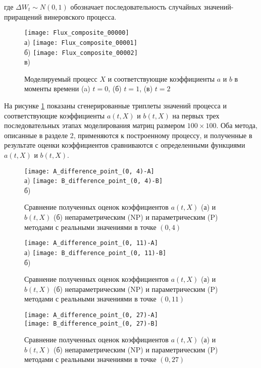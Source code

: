 где $\Delta W_t \sim N(0,1)$ обозначает последовательность случайных значений-приращений винеровского процесса.

\begin{figure}[!h]
	\centering
	\texttt{[image: Flux\_composite\_00000]}\\
	а)
	\texttt{[image: Flux\_composite\_00001]}\\
	б)
	\texttt{[image: Flux\_composite\_00002]}\\
	в)
	\caption{Моделируемый процесс $X$ и соответствующие коэффициенты $a$ и $b$ в моменты времени (a) $t=0$, (б) $t=1$, (в) $t=2$}
	\label{fig:flux_simulation}
\end{figure}

На рисунке \ref{fig:flux_simulation} показаны сгенерированные триплеты значений процесса и соответствующие коэффициенты $a(t,X)$ и $b(t,X)$ на первых трех последовательных этапах моделирования матриц размером $100 \times 100$. Оба метода, описанные в разделе 2, применяются к построенному процессу, и полученные в результате оценки коэффициентов сравниваются с определенными функциями $a(t,X)$ и $b(t,X)$.

\begin{figure}[!h]
	\centering
	\texttt{[image: A\_difference\_point\_(0, 4)-A]}\\
	а)
	\texttt{[image: B\_difference\_point\_(0, 4)-B]}\\
	б)
	\caption{Сравнение полученных оценок коэффициентов $a(t,X)$ (а) и $b(t,X)$ (б) непараметрическим (NP) и параметрическим (P) методами с реальными значениями в точке $(0,4)$}
	\label{fig:difference_0_4}
\end{figure}

\begin{figure}[!h]
	\centering
	\texttt{[image: A\_difference\_point\_(0, 11)-A]}\\
	а)
	\texttt{[image: B\_difference\_point\_(0, 11)-B]}\\
	б)
	\caption{Сравнение полученных оценок коэффициентов $a(t,X)$ (а) и $b(t,X)$ (б) непараметрическим (NP) и параметрическим (P) методами с реальными значениями в точке $(0,11)$}
	\label{fig:difference_0_11}
\end{figure}

\begin{figure}[!h]
	\centering
	\texttt{[image: A\_difference\_point\_(0, 27)-A]}\\
	\texttt{[image: B\_difference\_point\_(0, 27)-B]}\\
	\caption{Сравнение полученных оценок коэффициентов $a(t,X)$ (а) и $b(t,X)$ (б) непараметрическим (NP) и параметрическим (P) методами с реальными значениями в точке $(0,27)$}
	\label{fig:difference_0_27}
\end{figure}

